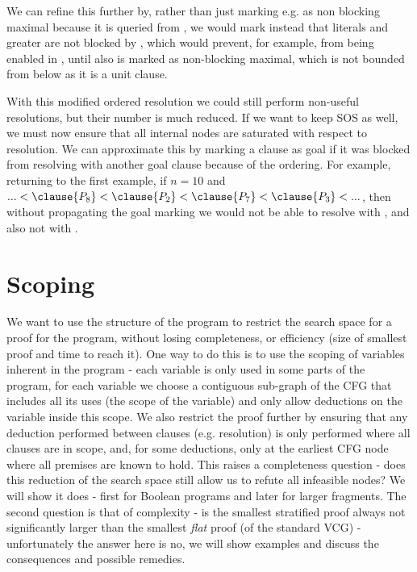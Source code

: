 We can refine this further by, rather than just marking e.g.  as non blocking maximal because it is queried from , we would mark instead that literals  and greater are not blocked by , which would prevent, for example,  from being enabled in , until also  is marked as non-blocking maximal, which is not bounded from below as it is a unit clause.

With this modified ordered resolution we could still perform non-useful resolutions, but their number is much reduced.
If we want to keep SOS as well, we must now ensure that all internal nodes are saturated with respect to resolution. 
We can approximate this by marking a clause as goal if it was blocked from resolving with another goal clause because of the ordering.
For example, returning to the first example, if $n=10$ and $...<\clause{P_8}<\clause{P_2}<\clause{P_7}<\clause{P_3}<...$, 
then without propagating the goal marking we would not be able to resolve 
 with , and also not 
 with .



\section{Scoping}
We want to use the structure of the program to restrict the search space for a proof for the program, without losing completeness, or efficiency (size of smallest proof and time to reach it).
One way to do this is to use the scoping of variables inherent in the program - each variable is only used in some parts of the program, for each variable we choose a contiguous sub-graph of the CFG that includes all its uses (the scope of the variable) and only allow deductions on the variable inside this scope.
We also restrict the proof further by ensuring that any deduction performed between clauses (e.g. resolution) is only performed where all clauses are in scope, and, for some deductions, only at the earliest CFG node where all premises are known to hold.
This raises a completeness question - does this reduction of the search space still allow us to refute all infeasible nodes? We will show it does - first for Boolean programs and later for larger fragments.
The second question is that of complexity - is the smallest stratified proof always not significantly larger than the smallest \emph{flat} proof (of the standard VCG) - unfortunately the answer here is no, we will show examples and discuss the consequences and possible remedies.


